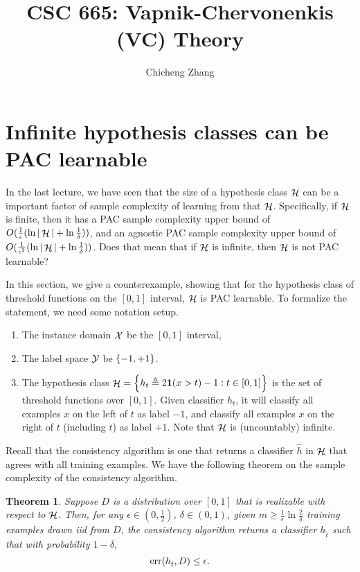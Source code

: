 \documentclass{article}
\title{CSC 665: Vapnik-Chervonenkis (VC) Theory}
\author{Chicheng Zhang}
\newtheorem{theorem}{Theorem}
\DeclareMathOperator*{\err}{{\rm err}}
\DeclareMathOperator*{\Xcal}{{\cal X}}
\DeclareMathOperator*{\Hcal}{{\cal H}}
\DeclareMathOperator*{\Ycal}{{\cal Y}}
\newcommand{\defeq}{\triangleq}
\newcommand*{\one}{{\bf 1}}
\begin{document}
\maketitle

\section{Infinite hypothesis classes can be PAC learnable}
In the last lecture, we have seen that the size of a hypothesis class $\Hcal$
can be a important factor of sample complexity of learning from that $\Hcal$.
Specifically, if $\Hcal$ is finite, then it has a PAC sample complexity upper bound
 of $O(\frac{1}{\epsilon}(\ln|\Hcal| + \ln\frac1\delta))$, and an agnostic PAC
sample complexity upper bound of $O(\frac{1}{\epsilon^2}(\ln|\Hcal| + \ln\frac1\delta))$.
Does that mean that if $\Hcal$ is infinite, then $\Hcal$ is not PAC learnable?

In this section, we give a counterexample, showing that for the hypothesis
class of threshold functions on the $[0,1]$ interval, $\Hcal$ is PAC learnable.
To formalize the statement, we need some notation setup.
\begin{enumerate}
  \item The instance domain $\Xcal$ be the $[0,1]$ interval,
  \item The label space $\Ycal$ be $\cbr{-1,+1}$.
  \item The hypothesis class $\Hcal = \cbr{h_t \defeq 2 \one(x > t)-1:  t \in [0,1]}$
is the set of threshold functions over $[0,1]$. Given classifier $h_t$, it will classify
all examples $x$ on the left of $t$ as label $-1$, and classify all examples $x$ on the right
of $t$ (including $t$) as label $+1$. Note that $\Hcal$ is (uncountably) infinite.
\end{enumerate}

Recall that the consistency algorithm is one that returns a classifier $\hat{h}$ in $\Hcal$
that agrees with all training examples.
We have the following theorem on the sample complexity of the consistency algorithm.

\begin{theorem}
Suppose $D$ is a distribution over $[0,1]$ that is realizable with respect to $\Hcal$.
Then, for any $\epsilon \in (0,\frac12)$, $\delta \in (0,1)$, given $m \geq \frac{1}{\epsilon} \ln\frac{2}{\delta}$ training examples drawn iid from $D$,
the consistency algorithm returns a classifier $h_{\hat{t}}$ such that with probability $1-\delta$,
\[ \err(h_{\hat{t}}, D) \leq \epsilon. \]
\label{thm:pac-thres}
\end{theorem}
\end{document}
